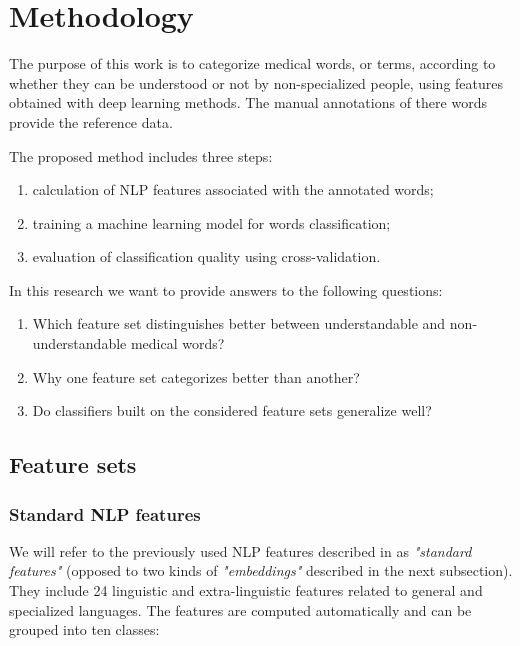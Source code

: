\chapter{Methodology}
\label{ch:methodology}

The purpose of this work is to categorize medical words, or terms, according to whether they can be understood or not by non-specialized people, using features obtained with deep learning methods. The manual annotations of there words provide the reference data. 


The proposed method includes three steps: 
\begin{enumerate}
    \item calculation of NLP features associated with the annotated words;
    \item training a machine learning model for words classification;
    \item evaluation of classification quality using cross-validation.
\end{enumerate}

In this research we want to provide answers to the following questions:
\begin{enumerate}
    \item Which feature set distinguishes better between understandable and non-understandable medical words?
    \item Why one feature set categorizes better than another?
    \item Do classifiers built on the considered feature sets generalize well? 
\end{enumerate}


\section{Feature sets}
\subsection{Standard NLP features}
\label{sec:standard-features}
We will refer to the previously used NLP features described in \citep{Grabar-PITR2014} as \textit{"standard features"} (opposed to two kinds of \textit{"embeddings"} described in the next subsection). They include 24 linguistic and extra-linguistic features related to general and specialized languages. The features are computed automatically and can be grouped into ten classes: 

